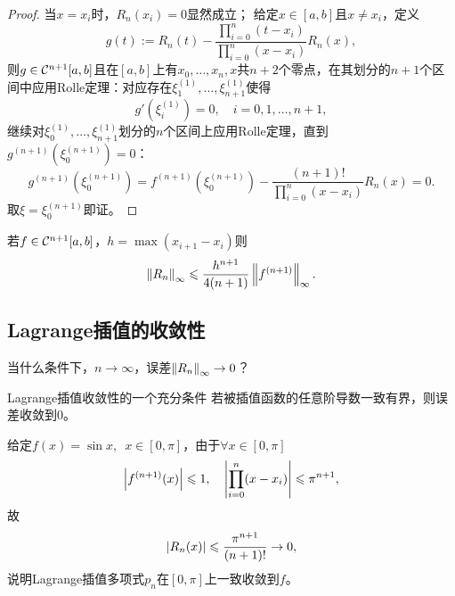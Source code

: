 \begin{proof}
    当$x=x_i$时，$R_n(x_i)=0$显然成立；
    给定$x\in[a,b]$且$x\neq x_i$，定义
    \[
        g(t):=R_n(t)-\frac{\prod_{i=0}^n(t-x_i)}{\prod_{i=0}^n(x-x_i)}R_n(x),
    \]
    则$g\in\mathcal C^{n+1}[a,b]$且在$[a,b]$上有$x_0,\ldots,x_n,x$共$n+2$个零点，在其划分的$n+1$个区间中应用Rolle定理：对应存在$\xi_1^{(1)},\ldots,\xi_{n+1}^{(1)}$使得
    \[
        g'(\xi_i^{(1)})=0,\quad i=0,1,\ldots,n+1,
    \]
    继续对$\xi_0^{(1)},\ldots,\xi_{n+1}^{(1)}$划分的$n$个区间上应用Rolle定理，直到$g^{(n+1)}(\xi^{(n+1)}_0)=0$：
    \[
        g^{(n+1)}(\xi^{(n+1)}_0)=f^{(n+1)}(\xi^{(n+1)}_0)-\frac{(n+1)!}{\prod_{i=0}^n(x-x_i)}R_n(x)=0.
    \]
    取$\xi=\xi_0^{(n+1)}$即证。
\end{proof}

\begin{corollary}
    若$f\in\mathcal C^{n+1}[a,b]$，$h=\max(x_{i+1}-x_i)$则
    \begin{equation}
        \left\lVert R_n\right\rVert_\infty\leqslant\frac{h^{n+1}}{4(n+1)}\left\lVert f^{(n+1)}\right\rVert_\infty.
    \end{equation}
\end{corollary}

\subsection{Lagrange插值的收敛性}

当什么条件下，$n\to\infty$，误差$\left\lVert R_n\right\rVert_\infty\to 0$？

\begin{theorem}
    {Lagrange插值收敛性的一个充分条件}{}
    若被插值函数的任意阶导数一致有界，则误差收敛到0。
\end{theorem}

\begin{example}
    {}{}
    给定$f(x)=\sin x,\enspace x\in[0,\pi]$，由于$\forall x\in[0,\pi]$
    \[
        \left\lvert f^{(n+1)}(x)\right\rvert\leqslant 1,\quad\left\lvert\prod_{i=0}^n(x-x_i)\right\rvert\leqslant\pi^{n+1},
    \]
    故
    \[
        \left\lvert R_n(x)\right\rvert\leqslant\frac{\pi^{n+1}}{(n+1)!}\to0,
    \]
    说明Lagrange插值多项式$p_n$在$[0,\pi]$上一致收敛到$f$。
\end{example}



